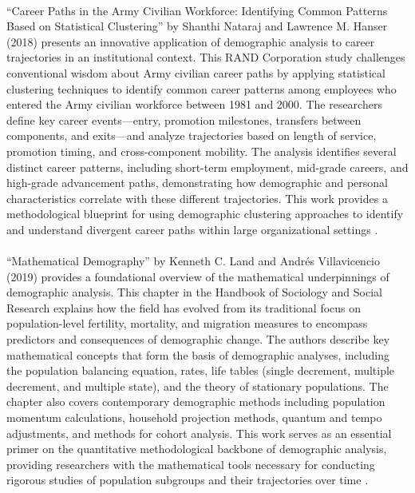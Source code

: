 \documentclass[../main.tex]{subfiles}
\begin{document}
\paragraph{} ``Career Paths in the Army Civilian Workforce: Identifying Common Patterns Based on Statistical Clustering'' by Shanthi Nataraj and Lawrence M. Hanser (2018) presents an innovative application of demographic analysis to career trajectories in an institutional context. This RAND Corporation study challenges conventional wisdom about Army civilian career paths by applying statistical clustering techniques to identify common career patterns among employees who entered the Army civilian workforce between 1981 and 2000. The researchers define key career events—entry, promotion milestones, transfers between components, and exits—and analyze trajectories based on length of service, promotion timing, and cross-component mobility. The analysis identifies several distinct career patterns, including short-term employment, mid-grade careers, and high-grade advancement paths, demonstrating how demographic and personal characteristics correlate with these different trajectories. This work provides a methodological blueprint for using demographic clustering approaches to identify and understand divergent career paths within large organizational settings \citep{nataraj2018career}.

\paragraph{} ``Mathematical Demography'' by Kenneth C. Land and Andrés Villavicencio (2019) provides a foundational overview of the mathematical underpinnings of demographic analysis. This chapter in the Handbook of Sociology and Social Research explains how the field has evolved from its traditional focus on population-level fertility, mortality, and migration measures to encompass predictors and consequences of demographic change. The authors describe key mathematical concepts that form the basis of demographic analyses, including the population balancing equation, rates, life tables (single decrement, multiple decrement, and multiple state), and the theory of stationary populations. The chapter also covers contemporary demographic methods including population momentum calculations, household projection methods, quantum and tempo adjustments, and methods for cohort analysis. This work serves as an essential primer on the quantitative methodological backbone of demographic analysis, providing researchers with the mathematical tools necessary for conducting rigorous studies of population subgroups and their trajectories over time \citep{land2019mathematical}.
\end{document}
